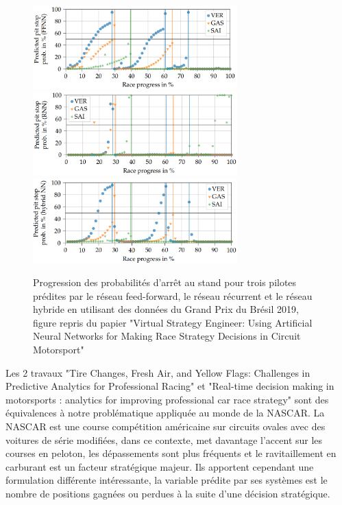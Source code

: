 \begin{figure}[H]
    \begin{center}
        \includegraphics[width=0.7\textwidth]{assets/figures/vse_ffnn.png}
        \includegraphics[width=0.7\textwidth]{assets/figures/vse_rnn.png}
        \includegraphics[width=0.7\textwidth]{assets/figures/vse_hnn.png}
        \caption{\label{vse_ffnn}Progression des probabilités d'arrêt au stand pour trois pilotes prédites par le réseau feed-forward, le réseau récurrent et le réseau hybride en utilisant des données du Grand Prix du Brésil 2019, figure repris du papier "Virtual Strategy Engineer: Using Artificial Neural Networks for Making Race Strategy Decisions in Circuit Motorsport"}
    \end{center}
\end{figure}

Les 2 travaux "Tire Changes, Fresh Air, and Yellow Flags: Challenges in Predictive Analytics for Professional Racing" \cite{doi:10.1089/big.2014.0018} et "Real-time decision making in motorsports : analytics for improving professional car race strategy"\cite{phdthesis}
sont des équivalences à notre problématique appliquée au monde de la NASCAR. La NASCAR est une course compétition américaine sur circuits ovales avec des voitures de série modifiées,
dans ce contexte, met davantage l'accent sur les courses en peloton, les dépassements sont plus fréquents et le ravitaillement en carburant est un facteur stratégique majeur.
Ils apportent cependant une formulation différente intéressante, la variable prédite par ses systèmes est le nombre de positions gagnées ou perdues à la suite d'une décision stratégique.

